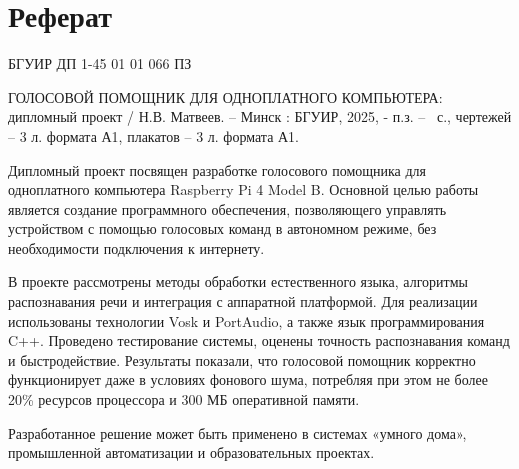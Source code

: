 \section*{Реферат}
\thispagestyle{empty} %

\noindent БГУИР ДП 1-45 01 01 066 ПЗ
\newline


\nohyphens{ГОЛОСОВОЙ ПОМОЩНИК ДЛЯ ОДНОПЛАТНОГО КОМПЬЮТЕРА}: дипломный проект / Н.В. Матвеев. – Минск : БГУИР, 2025, - п.з. – \pageref{LastPage}~с., чертежей – 3 л. формата А1, плакатов – 3 л. формата А1.

Дипломный проект посвящен разработке голосового помощника для одноплатного компьютера Raspberry Pi 4 Model B. Основной целью работы является создание программного обеспечения, позволяющего управлять устройством с помощью голосовых команд в автономном режиме, без необходимости подключения к интернету.

В проекте рассмотрены методы обработки естественного языка, алгоритмы распознавания речи и интеграция с аппаратной платформой. Для реализации использованы технологии Vosk и PortAudio, а также язык программирования C++. Проведено тестирование системы, оценены точность распознавания команд и быстродействие. Результаты показали, что голосовой помощник корректно функционирует даже в условиях фонового шума, потребляя при этом не более 20\% ресурсов процессора и 300 МБ оперативной памяти.

Разработанное решение может быть применено в системах «умного дома», промышленной автоматизации и образовательных проектах.

\clearpage
